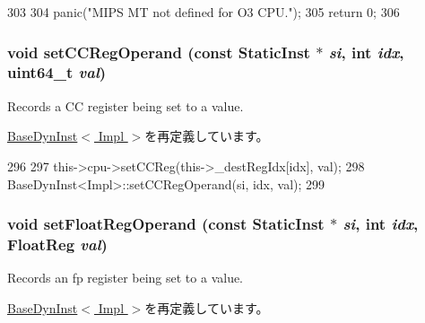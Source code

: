 \begin{DoxyCode}
303     {
304         panic("MIPS MT not defined for O3 CPU.\n");
305         return 0;
306     }
\end{DoxyCode}
\hypertarget{classBaseO3DynInst_afeb2b876cf6b29215cf9d6d56ba8863b}{
\subsubsection[{setCCRegOperand}]{\setlength{\rightskip}{0pt plus 5cm}void setCCRegOperand (const {\bf StaticInst} $\ast$ {\em si}, \/  int {\em idx}, \/  uint64\_\-t {\em val})}}
\label{classBaseO3DynInst_afeb2b876cf6b29215cf9d6d56ba8863b}
Records a CC register being set to a value. 

\hyperlink{classBaseDynInst_afeb2b876cf6b29215cf9d6d56ba8863b}{BaseDynInst$<$ Impl $>$}を再定義しています。


\begin{DoxyCode}
296     {
297         this->cpu->setCCReg(this->_destRegIdx[idx], val);
298         BaseDynInst<Impl>::setCCRegOperand(si, idx, val);
299     }
\end{DoxyCode}
\hypertarget{classBaseO3DynInst_addc8b4b6511725bf8ff48bd09ef22892}{
\subsubsection[{setFloatRegOperand}]{\setlength{\rightskip}{0pt plus 5cm}void setFloatRegOperand (const {\bf StaticInst} $\ast$ {\em si}, \/  int {\em idx}, \/  {\bf FloatReg} {\em val})}}
\label{classBaseO3DynInst_addc8b4b6511725bf8ff48bd09ef22892}
Records an fp register being set to a value. 

\hyperlink{classBaseDynInst_addc8b4b6511725bf8ff48bd09ef22892}{BaseDynInst$<$ Impl $>$}を再定義しています。


